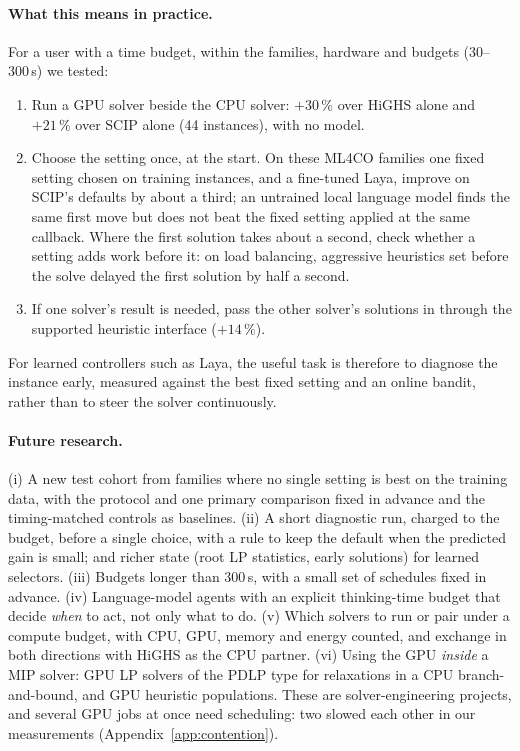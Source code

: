 \documentclass[11pt]{article}
\begin{document}
\paragraph{What this means in practice.} For a user with a time budget, within the families, hardware and budgets
(30--300\,s) we tested:
\begin{enumerate}
\item Run a GPU solver beside the CPU solver: $+30\,\%$ over HiGHS alone and $+21\,\%$ over SCIP alone (44 instances), with no model.
\item Choose the setting once, at the start. On these ML4CO families one fixed setting chosen on training instances,
  and a fine-tuned Laya, improve on SCIP's defaults by about a third; an untrained local language model finds the same
  first move but does not beat the fixed setting applied at the same callback. Where the first solution takes about a
  second, check whether a setting adds work before it: on load balancing, aggressive heuristics set before the solve
  delayed the first solution by half a second.
\item If one solver's result is needed, pass the other solver's solutions in through the supported heuristic
  interface ($+14\,\%$).
\end{enumerate}
For learned controllers such as Laya, the useful task is therefore to diagnose the instance early, measured against
the best fixed setting and an online bandit, rather than to steer the solver continuously.

\paragraph{Future research.} (i) A new test cohort from families where no single setting is best on the training
data, with the protocol and one primary comparison fixed in advance and the timing-matched controls as baselines.
(ii) A short diagnostic run, charged to the budget, before a single choice, with a rule to keep the default when the
predicted gain is small; and richer state (root LP statistics, early solutions) for learned selectors. (iii) Budgets
longer than 300\,s, with a small set of schedules fixed in advance. (iv) Language-model agents with an explicit
thinking-time budget that decide \emph{when} to act, not only what to do. (v) Which solvers to run or pair under a
compute budget, with CPU, GPU, memory and energy counted, and exchange in both directions with HiGHS as the CPU
partner. (vi) Using the GPU \emph{inside} a MIP solver: GPU LP solvers of the PDLP type for relaxations in a CPU
branch-and-bound, and GPU heuristic populations. These are solver-engineering projects, and several GPU jobs at once
need scheduling: two slowed each other in our measurements (Appendix~\ref{app:contention}).
\end{document}
